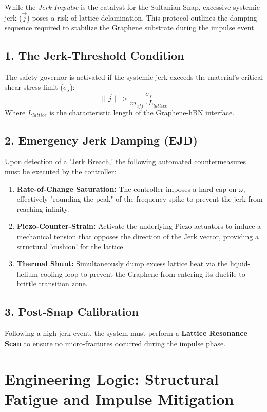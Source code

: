\documentclass[11pt]{article}
\begin{document}
While the \textit{Jerk-Impulse} is the catalyst for the Sultanian Snap, excessive systemic jerk ($\vec{j}$) poses a risk of lattice delamination. This protocol outlines the damping sequence required to stabilize the Graphene substrate during the impulse event.

\subsection*{1. The Jerk-Threshold Condition}
The safety governor is activated if the systemic jerk exceeds the material's critical shear stress limit ($\sigma_s$):
\begin{equation}
    \| \vec{j} \| > \frac{\sigma_s}{m_{eff} \cdot L_{lattice}}
\end{equation}
Where $L_{lattice}$ is the characteristic length of the Graphene-hBN interface.

\subsection*{2. Emergency Jerk Damping (EJD)}
Upon detection of a 'Jerk Breach,' the following automated countermeasures must be executed by the controller:

\begin{enumerate}
    \item \textbf{Rate-of-Change Saturation:} The controller imposes a hard cap on $\ddot{\omega}$, effectively "rounding the peak" of the frequency spike to prevent the jerk from reaching infinity.
    \item \textbf{Piezo-Counter-Strain:} Activate the underlying Piezo-actuators to induce a mechanical tension that opposes the direction of the Jerk vector, providing a structural 'cushion' for the lattice.
    \item \textbf{Thermal Shunt:} Simultaneously dump excess lattice heat via the liquid-helium cooling loop to prevent the Graphene from entering its ductile-to-brittle transition zone.
\end{enumerate}

\subsection*{3. Post-Snap Calibration}
Following a high-jerk event, the system must perform a \textbf{Lattice Resonance Scan} to ensure no micro-fractures occurred during the impulse phase.

\section*{Engineering Logic: Structural Fatigue and Impulse Mitigation}
\end{document}
